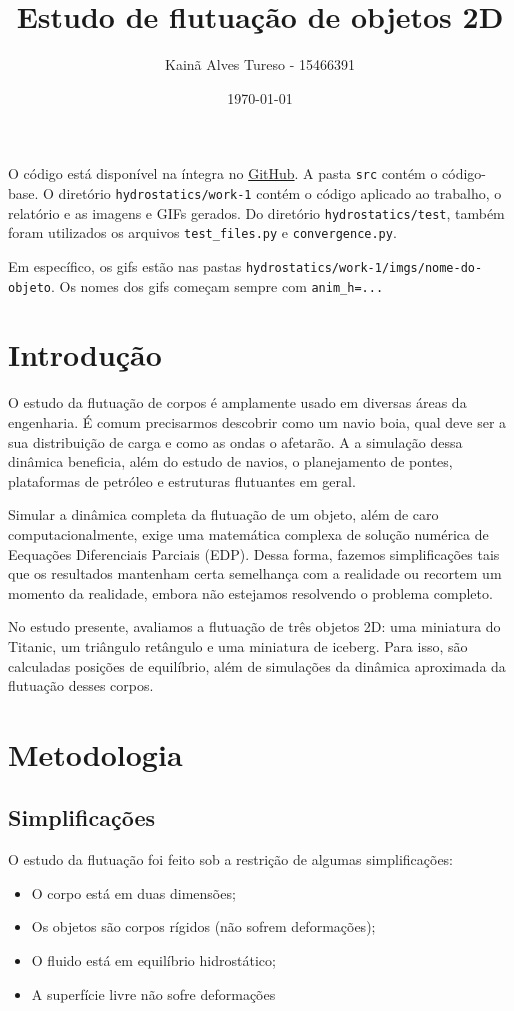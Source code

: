 \documentclass[
	12pt,				%
	oneside,			%
	a4paper,			%
	]{article}
\author{Kainã Alves Tureso - 15466391}
\date{\today}
\title{Estudo de flutuação de objetos 2D}
\begin{document}
    \maketitle    
    \tableofcontents
    \break

    O código está disponível na íntegra no \href{https://github.com/kainaas/MecFluComp1}{GitHub}. A pasta \texttt{src} contém o código-base. O diretório \texttt{hydrostatics/work-1} contém o código aplicado ao trabalho, o relatório e as imagens e GIFs gerados. Do diretório \texttt{hydrostatics/test}, também foram utilizados os arquivos \texttt{test\_files.py} e \texttt{convergence.py}.

    Em específico, os gifs estão nas pastas \texttt{hydrostatics/work-1/imgs/{nome-do-objeto}}. Os nomes dos gifs começam sempre com \texttt{anim\_h=...}


    \break
    \section{Introdução}
    O estudo da flutuação de corpos é amplamente usado em diversas áreas da engenharia. É comum precisarmos descobrir como um navio boia, qual deve ser a sua distribuição de carga e como as ondas o afetarão. A a simulação dessa dinâmica beneficia, além do estudo de navios, o planejamento de pontes, plataformas de petróleo e estruturas flutuantes em geral.
    
    Simular a dinâmica completa da flutuação de um objeto, além de caro computacionalmente, exige uma matemática complexa de solução numérica de Eequações Diferenciais Parciais (EDP). Dessa forma, fazemos simplificações tais que os resultados mantenham certa semelhança com a realidade ou recortem um momento da realidade, embora não estejamos resolvendo o problema completo.
    
    No estudo presente, avaliamos a flutuação de três objetos 2D: uma miniatura do Titanic, um triângulo retângulo e uma miniatura de iceberg. Para isso, são calculadas posições de equilíbrio, além de simulações da dinâmica aproximada da flutuação desses corpos.

    
    
    \section{Metodologia}
    
    \subsection{Simplificações}
    O estudo da flutuação foi feito sob a restrição de algumas simplificações:
    \begin{itemize}
        \item O corpo está em duas dimensões;
        \item Os objetos são corpos rígidos (não sofrem deformações);
        \item O fluido está em equilíbrio hidrostático;
        \item A superfície livre não sofre deformações
    \end{itemize}
\end{document}
